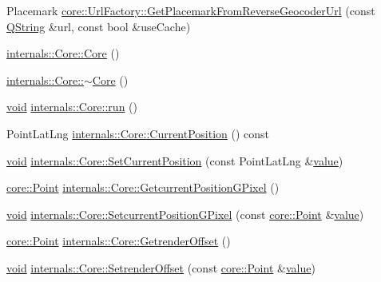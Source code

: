 \begin{DoxyCompactItemize}
\item 
Placemark \hyperlink{group___o_p_map_widget_ga6f4535cb1c90494c811786af2dbac194}{core\-::\-Url\-Factory\-::\-Get\-Placemark\-From\-Reverse\-Geocoder\-Url} (const \hyperlink{group___u_a_v_objects_plugin_gab9d252f49c333c94a72f97ce3105a32d}{Q\-String} \&url, const bool \&use\-Cache)
\item 
\hyperlink{group___o_p_map_widget_ga7ec14a145f0d7ff3036d68814659e27d}{internals\-::\-Core\-::\-Core} ()
\item 
\hyperlink{group___o_p_map_widget_ga6ad5ec431c303aa0ea029c86fc7a5728}{internals\-::\-Core\-::$\sim$\-Core} ()
\item 
\hyperlink{group___u_a_v_objects_plugin_ga444cf2ff3f0ecbe028adce838d373f5c}{void} \hyperlink{group___o_p_map_widget_ga0d0ab90f1256808e363cd35dd5f2fa7f}{internals\-::\-Core\-::run} ()
\item 
Point\-Lat\-Lng \hyperlink{group___o_p_map_widget_ga44a14bf2d358ec5f93c7a99416e20732}{internals\-::\-Core\-::\-Current\-Position} () const 
\item 
\hyperlink{group___u_a_v_objects_plugin_ga444cf2ff3f0ecbe028adce838d373f5c}{void} \hyperlink{group___o_p_map_widget_ga4e5d816fef373048f1109beac294521c}{internals\-::\-Core\-::\-Set\-Current\-Position} (const Point\-Lat\-Lng \&\hyperlink{glext_8h_aa0e2e9cea7f208d28acda0480144beb0}{value})
\item 
\hyperlink{structcore_1_1_point}{core\-::\-Point} \hyperlink{group___o_p_map_widget_ga705325edd0aba942d5a67990c7d07136}{internals\-::\-Core\-::\-Getcurrent\-Position\-G\-Pixel} ()
\item 
\hyperlink{group___u_a_v_objects_plugin_ga444cf2ff3f0ecbe028adce838d373f5c}{void} \hyperlink{group___o_p_map_widget_ga68af707707e7a27c72969b84ffcdc206}{internals\-::\-Core\-::\-Setcurrent\-Position\-G\-Pixel} (const \hyperlink{structcore_1_1_point}{core\-::\-Point} \&\hyperlink{glext_8h_aa0e2e9cea7f208d28acda0480144beb0}{value})
\item 
\hyperlink{structcore_1_1_point}{core\-::\-Point} \hyperlink{group___o_p_map_widget_gae32df0621adec51500130103787bf6a0}{internals\-::\-Core\-::\-Getrender\-Offset} ()
\item 
\hyperlink{group___u_a_v_objects_plugin_ga444cf2ff3f0ecbe028adce838d373f5c}{void} \hyperlink{group___o_p_map_widget_ga78c39b61dd28bb05639737d0e72576fe}{internals\-::\-Core\-::\-Setrender\-Offset} (const \hyperlink{structcore_1_1_point}{core\-::\-Point} \&\hyperlink{glext_8h_aa0e2e9cea7f208d28acda0480144beb0}{value})
\item 

\end{DoxyCompactItemize}
